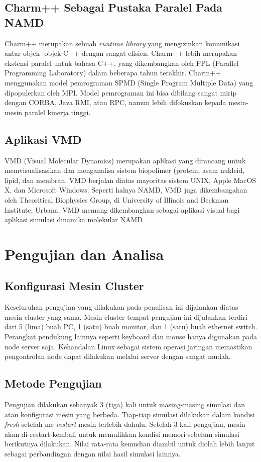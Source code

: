 \documentclass[aps,showpacs,pre,floatfix]{revtex4}
\begin{document}
\subsection{Charm++ Sebagai Pustaka Paralel Pada NAMD}



Charm++ merupakan sebuah \textit{runtime library} yang mengizinkan
komunikasi antar objek- objek C++ dengan sangat efisien. Charm++
lebih merupakan ekstensi paralel untuk bahasa C++, yang
dikembangkan oleh PPL (Parallel Programming Laboratory) dalam
beberapa tahun terakhir. Charm++  menggunakan model pemrograman
SPMD (Single Program Multiple Data) yang dipopulerkan oleh MPI.
Model pemrograman ini bisa dibilang sangat mirip dengan CORBA,
Java RMI, atau RPC, namun lebih difokuskan kepada mesin-mesin
paralel kinerja tinggi.


\subsection{Aplikasi VMD}

VMD (Visual Molecular Dynamics) merupakan aplikasi yang dirancang
untuk memvisualisasikan dan menganalisa sistem biopolimer
(protein, asam nukleid, lipid, dan membran. VMD berjalan diatas
mayoritas sistem UNIX, Apple MacOS X, dan Microsoft Windows.
Seperti halnya NAMD, VMD juga dikembangakan oleh Theoritical
Biophysics Group, di University of Illinois and Beckman Institute,
Urbana. VMD memang dikembangkan sebagai aplikasi visual bagi
aplikasi simulasi dinamika molekular NAMD


\section{Pengujian dan Analisa}



\subsection{Konfigurasi Mesin Cluster}
Keseluruhan pengujian yang dilakukan pada penulisan ini dijalankan
diatas mesin cluster yang sama. Mesin cluster tempat pengujian ini
dijalankan terdiri dari 5 (lima) buah PC, 1 (satu) buah monitor,
dan 1 (satu) buah ethernet switch. Perangkat pendukung lainnya
seperti keyboard dan mouse hanya digunakan pada node server saja.
Kehandalan Linux sebagai sistem operasi jaringan memastikan
pengontrolan node dapat dilakukan melalui server dengan sangat
mudah.


\subsection{Metode Pengujian}
Pengujian dilakukan sebanyak 3 (tiga) kali untuk masing-masing
simulasi dan atau konfigurasi mesin yang berbeda. Tiap-tiap
simulasi dilakukan dalam kondisi \textit{fresh} setelah
me-\textit{restart }mesin terlebih dahulu. Setelah 3 kali
pengujian, mesin akan di-restart kembali untuk memulihkan kondisi
memori sebelum simulasi berikutnya dilakukan. Nilai rata-rata
kemudian diambil untuk diolah lebih lanjut sebagai perbandingan
dengan nilai hasil simulasi lainnya.
\end{document}
